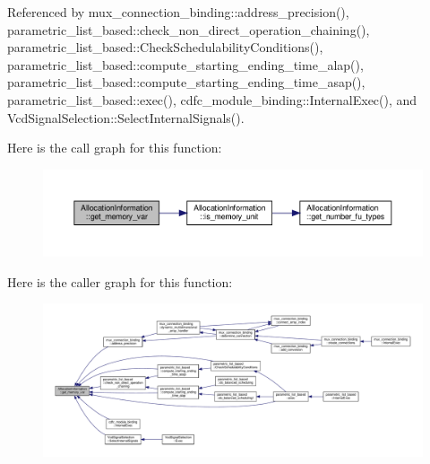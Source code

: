 Referenced by mux\+\_\+connection\+\_\+binding\+::address\+\_\+precision(), parametric\+\_\+list\+\_\+based\+::check\+\_\+non\+\_\+direct\+\_\+operation\+\_\+chaining(), parametric\+\_\+list\+\_\+based\+::\+Check\+Schedulability\+Conditions(), parametric\+\_\+list\+\_\+based\+::compute\+\_\+starting\+\_\+ending\+\_\+time\+\_\+alap(), parametric\+\_\+list\+\_\+based\+::compute\+\_\+starting\+\_\+ending\+\_\+time\+\_\+asap(), parametric\+\_\+list\+\_\+based\+::exec(), cdfc\+\_\+module\+\_\+binding\+::\+Internal\+Exec(), and Vcd\+Signal\+Selection\+::\+Select\+Internal\+Signals().

Here is the call graph for this function\+:
\nopagebreak
\begin{figure}[H]
\begin{center}
\leavevmode
\includegraphics[width=350pt]{d7/d79/classAllocationInformation_aca7d9a076d5c26ffe60388b0b59a9903_cgraph}
\end{center}
\end{figure}
Here is the caller graph for this function\+:
\nopagebreak
\begin{figure}[H]
\begin{center}
\leavevmode
\includegraphics[width=350pt]{d7/d79/classAllocationInformation_aca7d9a076d5c26ffe60388b0b59a9903_icgraph}
\end{center}
\end{figure}
\mbox{\label{classAllocationInformation_a8468ee7208e4d231c58e7c82e4a8a9aa}} 
